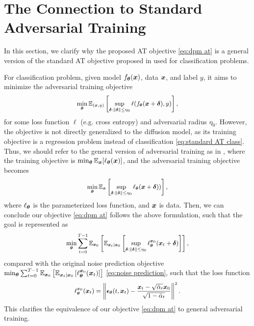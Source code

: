 \section{The Connection to Standard Adversarial Training}\label{app:connection to AT}
In this section, we clarify why the proposed AT objective \eqref{eq:dpm at} is a general version of the standard AT objective proposed in \citep{madry2018towards} used for classification problems. 
\par
For classification problem, given model $f_{\boldsymbol{\theta}}(\boldsymbol{x})$, data $\boldsymbol{x}$, and label $y$, it aims to minimize the adversarial training objective 
\begin{equation}\label{eq:standard AT class}
    \small
        \min_{\boldsymbol{\theta}}\mathbb{E}_{(\boldsymbol{x}, y)}\left[\sup_{\boldsymbol{\delta}:\|\boldsymbol{\delta}\|\leq \eta_{0}}\ell(f_{\boldsymbol{\theta}}(\boldsymbol{x} + \boldsymbol{\delta}), y)\right],
\end{equation}
for some loss function $\ell$ (e.g. cross entropy) and adversarial radius $\eta_{0}$. However, the objective is not directly generalized to the diffusion model, as its training objective is a regression problem instead of classification \eqref{eq:standard AT class}. Thus, we should refer to the general version of adversarial training as in \citep{yi2021improved,sinha2018certifying}, where the training objective is $\min_{\boldsymbol{\theta}}\mathbb{E}_{\boldsymbol{x}}[\ell_{\boldsymbol{\theta}}(\boldsymbol{x})]$, and the adversarial training objective becomes
\begin{equation}
    \small
    \min_{\boldsymbol{\theta}}\mathbb{E}_{\boldsymbol{x}}\left[\sup_{\boldsymbol{\delta}:\|\boldsymbol{\delta}\|\leq \eta_{0}}\ell_{\boldsymbol{\theta}}(\boldsymbol{x} + \boldsymbol{\delta}))\right],
\end{equation}
where $\ell_{\boldsymbol{\theta}}$ is the parameterized loss function, and $\boldsymbol{x}$ is data. Then, we can conclude our objective \eqref{eq:dpm at} follows the above formulation, such that the goal is represented as 
\begin{equation}
    \small
        \min_{\boldsymbol{\theta}}\sum_{t=0}^{T - 1}\mathbb{E}_{\boldsymbol{x}_{0}}\left[\mathbb{E}_{\boldsymbol{x}_{t}\mid \boldsymbol{x}_{0}}\left[\sup_{\boldsymbol{\delta}:\|\boldsymbol{\delta}\|\leq \eta_{0}}\ell_{\boldsymbol{\theta}}^{\boldsymbol{x}_{0}}(\boldsymbol{x}_{t} + \boldsymbol{\delta})\right]\right],    
\end{equation}
compared with the original noise prediction objective $\min_{\boldsymbol{\theta}}\sum_{t=0}^{T - 1}\mathbb{E}_{\boldsymbol{x}_{0}}\left[\mathbb{E}_{\boldsymbol{x}_{t}\mid \boldsymbol{x}_{0}}\left[\ell_{\boldsymbol{\theta}}^{\boldsymbol{x}_{0}}(\boldsymbol{x}_{t})\right]\right]$ \eqref{eq:noise prediction}, such that the loss function 
\begin{equation}
    \small
    \ell_{\boldsymbol{\theta}}^{\boldsymbol{x}_{0}}(\boldsymbol{x}_{t}) = \left\|\boldsymbol{\epsilon}_{\boldsymbol{\theta}}(t, \boldsymbol{x}_{t}) - \frac{\boldsymbol{x}_{t} - \sqrt{\bar{\alpha}_{t}}\boldsymbol{x}_{0}}{\sqrt{1 - \bar{\alpha}_{t}}}\right\|^{2}. 
\end{equation}
This clarifies the equivalence of our objective \eqref{eq:dpm at} to general adversarial training. 

